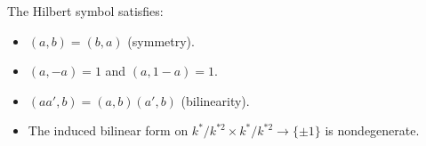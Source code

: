 The Hilbert symbol satisfies:
\begin{itemize}
\item[(i)] $(a, b) = (b, a)$ (symmetry).
\item[(ii)] $(a, -a) = 1$ and $(a, 1-a) = 1$.
\item[(iii)] $(aa', b) = (a, b)(a', b)$ (bilinearity).
\item[(iv)] The induced bilinear form on $k^*/k^{*2} \times k^*/k^{*2} \to \{\pm 1\}$ is nondegenerate.
\end{itemize}
